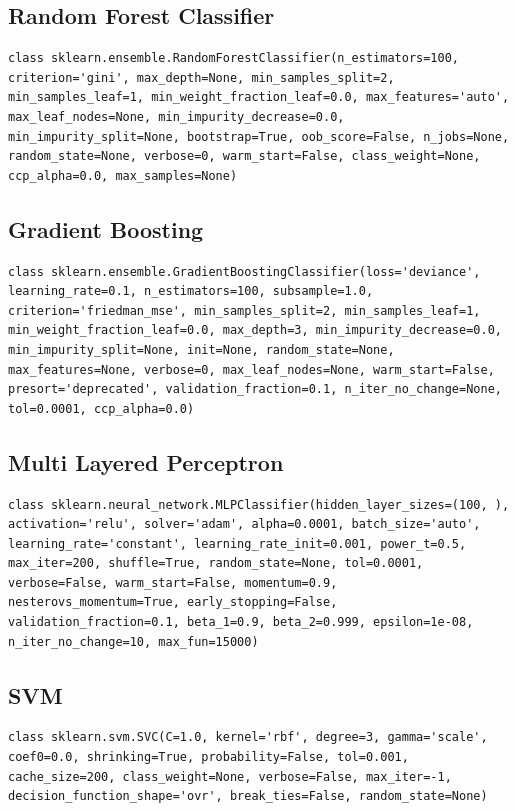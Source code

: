 \documentclass[12pt]{article}
\begin{document}
\subsection{Random Forest Classifier}
\begin{lstlisting}
class sklearn.ensemble.RandomForestClassifier(n_estimators=100, criterion='gini', max_depth=None, min_samples_split=2, min_samples_leaf=1, min_weight_fraction_leaf=0.0, max_features='auto', max_leaf_nodes=None, min_impurity_decrease=0.0, min_impurity_split=None, bootstrap=True, oob_score=False, n_jobs=None, random_state=None, verbose=0, warm_start=False, class_weight=None, ccp_alpha=0.0, max_samples=None)
\end{lstlisting}

\subsection{Gradient Boosting}
\begin{lstlisting}
class sklearn.ensemble.GradientBoostingClassifier(loss='deviance', learning_rate=0.1, n_estimators=100, subsample=1.0, criterion='friedman_mse', min_samples_split=2, min_samples_leaf=1, min_weight_fraction_leaf=0.0, max_depth=3, min_impurity_decrease=0.0, min_impurity_split=None, init=None, random_state=None, max_features=None, verbose=0, max_leaf_nodes=None, warm_start=False, presort='deprecated', validation_fraction=0.1, n_iter_no_change=None, tol=0.0001, ccp_alpha=0.0)
\end{lstlisting}

\newpage
\subsection{Multi Layered Perceptron}
\begin{lstlisting}
class sklearn.neural_network.MLPClassifier(hidden_layer_sizes=(100, ), activation='relu', solver='adam', alpha=0.0001, batch_size='auto', learning_rate='constant', learning_rate_init=0.001, power_t=0.5, max_iter=200, shuffle=True, random_state=None, tol=0.0001, verbose=False, warm_start=False, momentum=0.9, nesterovs_momentum=True, early_stopping=False, validation_fraction=0.1, beta_1=0.9, beta_2=0.999, epsilon=1e-08, n_iter_no_change=10, max_fun=15000)
\end{lstlisting}

\subsection{SVM}
\begin{lstlisting}
class sklearn.svm.SVC(C=1.0, kernel='rbf', degree=3, gamma='scale', coef0=0.0, shrinking=True, probability=False, tol=0.001, cache_size=200, class_weight=None, verbose=False, max_iter=-1, decision_function_shape='ovr', break_ties=False, random_state=None)
\end{lstlisting}
\end{document}

